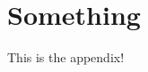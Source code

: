 \documentclass[../../main.tex]{subfiles}  %
\begin{document}

\section{Something}
This is the appendix!
\end{document}

